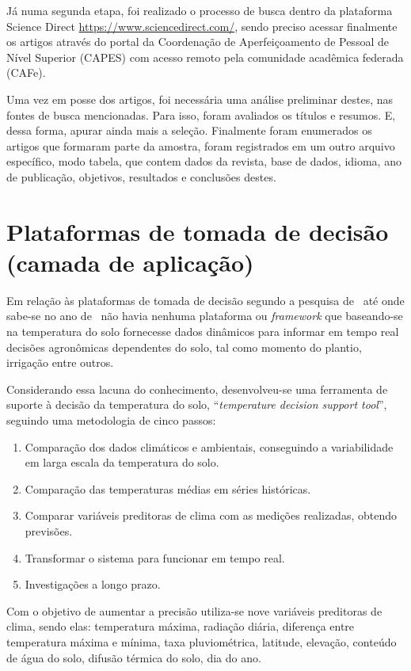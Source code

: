 \documentclass[
article,			%
12pt,				%
oneside,			%
a4paper,			%
english,			%
brazil,				%
sumario=tradicional
]{abntex2}
\begin{document}
Já numa segunda etapa, foi realizado o processo de busca dentro da plataforma Science Direct \url{https://www.sciencedirect.com/}, sendo preciso acessar finalmente os artigos através do portal da Coordenação de Aperfeiçoamento de Pessoal de Nível Superior (CAPES) com acesso remoto pela comunidade acadêmica federada (CAFe).

Uma vez em posse dos artigos, foi necessária uma análise preliminar destes, nas fontes de busca mencionadas. Para isso, foram avaliados os títulos e resumos. E, dessa forma, apurar ainda mais a seleção. Finalmente foram enumerados os artigos que formaram parte da amostra, foram registrados em um outro arquivo específico, modo tabela, que contem dados da revista, base de dados, idioma, ano de publicação, objetivos, resultados e conclusões destes.

\section{Plataformas de tomada de decisão (camada de aplicação)}\label{Plataformas de tomada de decisão}%
Em relação às plataformas de tomada de decisão segundo a pesquisa de~\citeauthor{1} até onde sabe-se no ano de~\citeyear{1} não havia nenhuma plataforma ou \textit{framework} que baseando-se na temperatura do solo fornecesse dados dinâmicos para informar em tempo real decisões agronômicas dependentes do solo, tal como momento do plantio, irrigação entre outros.

Considerando essa lacuna do conhecimento, desenvolveu-se uma ferramenta de suporte à decisão da temperatura do solo, ``\textit{temperature decision support tool}'', seguindo uma metodologia de cinco passos:
\begin{enumerate}
  \item Comparação dos dados climáticos e ambientais, conseguindo a variabilidade em larga escala da temperatura do solo.

  \item Comparação das temperaturas médias em séries históricas.
  \item Comparar variáveis preditoras de clima com as medições realizadas, obtendo previsões.
  \item Transformar o sistema para funcionar em tempo real.
  \item Investigações a longo prazo.
\end{enumerate}

Com o objetivo de aumentar a precisão utiliza-se nove variáveis preditoras de clima, sendo elas: temperatura máxima, radiação diária, diferença entre temperatura máxima e mínima, taxa pluviométrica, latitude, elevação, conteúdo de água do solo, difusão térmica do solo, dia do ano.
\end{document}

